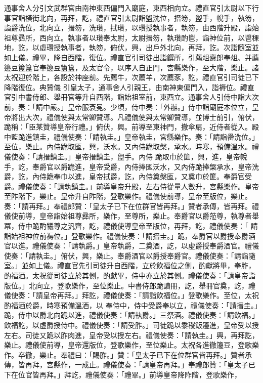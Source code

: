 \begin{pinyinscope}
 通事舍人分引文武群官由南神東西偏門入廟庭，東西相向立。禮直官引太尉以下行
 事官詣橫街北向，再拜，訖，禮直官引太尉詣盥洗位，搢笏，盥手，帨手，執笏，詣爵洗位，北向立，搢笏，洗瓚，拭瓚，以瓚授執事者，執笏，由西階升殿，詣始祖尊彞所，西向立。執事者以瓚奉太尉，太尉搢笏，執瓚酌鬯，詣神位前，以鬯稞地，訖，以虛瓚授執事者，執笏，俯伏，興，出戶外北向，再拜，訖。次詣隨室並如上儀。禮畢，降自西階，復位。禮直官引司徒出詣饌所，引薦俎齋郎奉俎、并薦籩豆簠簋官奉籩豆簠簋，及太官令，以序入自正門，宮縣樂作，至大階，樂止。諸太祝迎於階上，各設於神座前。先薦牛，次薦羊，次薦豕，訖，禮直官引司徒已下降階復位。典贊儀
 引皇太子，通事舍人引親王，由南神東偏門入，詣褥位。禮直官引中書侍郎、舉冊官等升自西階，詣始祖室前，東西立。通事舍人引侍中詣大次前，奏：「請中嚴。」皇帝服袞冕。少頃，侍中奏：「外辦。」侍中詣廟庭本位立，皇帝將出大次，禮儀使與太常卿贊導。凡禮儀使與太常卿贊導，並博士前引，俯伏，跪稱：「臣某贊導皇帝行禮。」俯伏，興。前導至東神門，撤傘扇，近侍者從入。殿中監跪進鎮圭，禮儀使奏：「請執圭。」皇帝執圭，宮縣樂作。奏：「請詣罍洗位。」至位，樂止。內侍跪取匜，興，沃水。又內侍跪取槃，承水。時寒，預備溫水。禮儀使奏：「請搢鎮圭。」皇帝搢鎮圭，盥手。內侍
 跪取巾於篚，興，進，皇帝帨手，訖，奉爵官以爵跪進，皇帝受爵，內侍捧匜沃水，又內侍跪捧槃承水，皇帝洗爵，訖，內侍跪奉巾以進，皇帝拭爵，訖，內侍奠槃匜，又奠巾於篚。奉爵官受爵。禮儀使奏：「請執鎮圭。」前導皇帝升殿，左右侍從量人數升，宮縣樂作。皇帝至阼階下，樂止。皇帝升自阼階，登歌樂作。禮儀使前導，皇帝至版位，樂止。奏：「請再拜。」奉禮郎贊：「皇太子已下在位群官皆再拜。」贊者承傳，皆再拜。禮儀使前導，皇帝詣始祖尊彞所，樂作，至尊所，樂止。奉爵官以爵蒞尊，執尊者舉冪，侍中跪酌犧尊之汎齊，訖，禮儀使導皇帝至版位，再拜，訖，禮儀使奏：「
 請詣始祖神位前褥位。」登歌樂作。禮儀使奏：「請搢圭。」跪，奉爵官以爵授奉爵酒官以進。禮儀使奏：「請執爵。」皇帝執爵，二奠酒，訖，以虛爵授奉爵酒官。禮儀使奏：「請執圭。」俯伏，興，樂止。奉爵酒官以爵授奉爵官。禮儀使奏：「請詣隨室。」並如上儀。禮直官先引司徒升自西階，立於飲福位之側，酌獻將畢，奉胙，酌福酒。太祝從司徒立於其側，酌獻畢，侍中亦立於其側。禮儀使奏：「請皇帝詣版位。」北向立，登歌樂作，至位樂止。中書侍郎跪讀冊，訖，舉冊官奠，訖，禮儀使奏：「請皇帝再拜。」拜訖，禮儀使奏：「請詣飲福位。」登歌樂作。至位，太祝酌福酒於爵，時寒預備溫酒，以
 奉侍中，侍中受爵奉以立，禮儀使奏：「請搢圭。」跪，侍中以爵北向跪以進，禮儀使奏：「請執爵。」三祭酒。禮儀使奏：「請飲福。」飲福訖，以虛爵授侍中。禮儀使奏：「請受胙。」司徒跪以黍稷飯籩進，皇帝受以授左右。司徒又跪以胙肉進，皇帝受以授左右。禮儀使奏：「請執圭。」興，再拜訖，樂止。禮儀使前導，皇帝還版位，登歌樂作，至位樂止。太祝各進徹籩豆，登歌樂作。卒徹，樂止。奉禮曰：「賜胙。」贊：「皇太子已下在位群官皆再拜。」贊者承傳，皆再拜，宮縣作，一成止。禮儀使奏：「請皇帝再拜。」奉禮郎贊：「皇太子已下在位官皆再拜。」拜訖，禮儀使奏：「禮畢。」前導皇帝降阼階，登歌樂作，

\end{pinyinscope}
